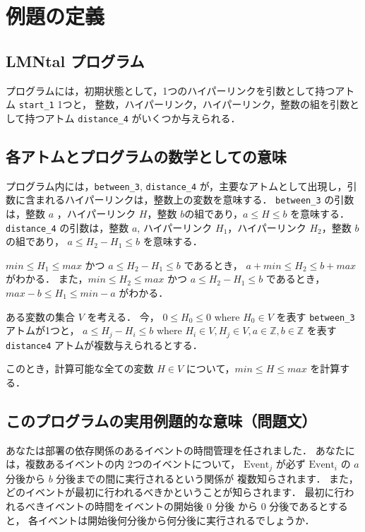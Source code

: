 \section{例題の定義}

\subsection{LMNtal プログラム}

プログラムには，初期状態として，1つのハイパーリンクを引数として持つアトム \texttt{start\_1} 1つと，
整数，ハイパーリンク，ハイパーリンク，整数の組を引数として持つアトム \texttt{distance\_4} がいくつか与えられる．



\subsection{各アトムとプログラムの数学としての意味}

プログラム内には，\texttt{between\_3}, \texttt{distance\_4} が，主要なアトムとして出現し，引数に含まれるハイパーリンクは，整数上の変数を意味する．
\texttt{between\_3} の引数は，整数 $a$ ，ハイパーリンク $H$，整数 $b$の組であり，$a \leq H \leq b$ を意味する．
\texttt{distance\_4} の引数は，整数 $a$, ハイパーリンク $H_1$，ハイパーリンク $H_2$，整数 $b$ の組であり， $a \leq H_2 - H_1 \leq b$ を意味する．

$min \leq H_1 \leq max$ かつ $a \leq H_2 - H_1 \leq b$ であるとき，
$a+min \leq H_2 \leq b+max $ がわかる．
また，$min \leq H_2 \leq max$ かつ $a \leq H_2 - H_1 \leq b$ であるとき，
$max-b \leq H_1 \leq min-a $ がわかる．


ある変数の集合 $V$ を考える．
今，
$0 \leq H_0 \leq 0$ where $H_0 \in V$ を表す \texttt{between\_3} アトムが1つと，
$a \leq H_j - H_i \leq b$ where $H_i \in V, H_j \in V, a \in \mathbb{Z}, b \in \mathbb{Z}$ を表す \texttt{distance4} アトムが複数与えられるとする．

このとき，計算可能な全ての変数 $H \in V$ について，$min \leq H \leq max$ を計算する．

\subsection{このプログラムの実用例題的な意味（問題文）}
あなたは部署の依存関係のあるイベントの時間管理を任されました．
あなたには，複数あるイベントの内 2つのイベントについて，
$\text{Event}_j$ が必ず $\text{Event}_i$ の $a$ 分後から $b$ 分後までの間に実行されるという関係が
複数知らされます．
また，どのイベントが最初に行われるべきかということが知らされます．
最初に行われるべきイベントの時間をイベントの開始後 0 分後 から 0 分後であるとすると，
各イベントは開始後何分後から何分後に実行されるでしょうか．

